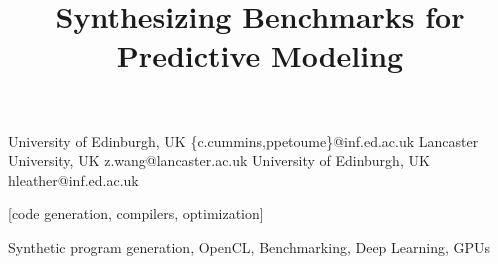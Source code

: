 \makeatletter
\def\@copyrightspace{\relax}
\makeatother

\setlength{\pdfpageheight}{\paperheight}
\setlength{\pdfpagewidth}{\paperwidth}


\title{Synthesizing Benchmarks for Predictive Modeling}
           {University of Edinburgh, UK}
           {\{c.cummins,ppetoume\}@inf.ed.ac.uk}
           {Lancaster University, UK}
           {z.wang@lancaster.ac.uk}
           {University of Edinburgh, UK}
           {hleather@inf.ed.ac.uk}

\maketitle

\begin{abstract}

\end{abstract}

[code generation, compilers, optimization]

\keywords
Synthetic program generation, %
OpenCL, %
Benchmarking, %
Deep Learning, %
GPUs
